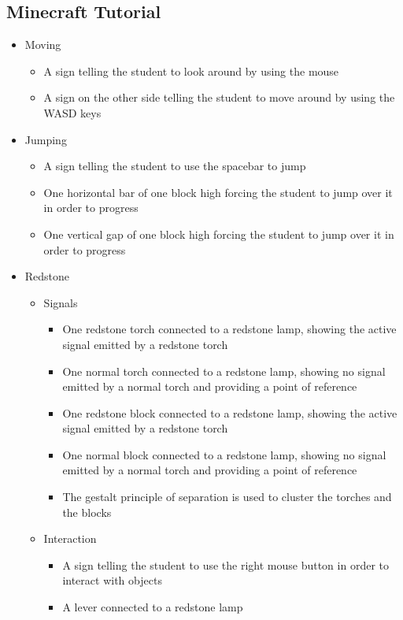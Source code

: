 \documentclass[11pt,twoside]{report} %
\begin{document}
\subsection{Minecraft Tutorial}

\begin{itemize}
	\item Moving
	\begin{itemize}
		\item A sign telling the student to look around by using the mouse
		\item A sign on the other side telling the student to move around by using the WASD keys
	\end{itemize}
	\item Jumping
	\begin{itemize}
		\item A sign telling the student to use the spacebar to jump
		\item One horizontal bar of one block high forcing the student to jump over it in order to progress
		\item One vertical gap of one block high forcing the student to jump over it in order to progress
	\end{itemize}
	\item Redstone
	\begin{itemize}
		\item Signals
		\begin{itemize}
			\item One redstone torch connected to a redstone lamp, showing the active signal emitted by a redstone torch
			\item One normal torch connected to a redstone lamp, showing no signal emitted by a normal torch and providing a point of reference
			\item One redstone block connected to a redstone lamp, showing the active signal emitted by a redstone torch
			\item One normal block connected to a redstone lamp, showing no signal emitted by a normal torch and providing a point of reference
			\item The gestalt principle of separation is used to cluster the torches and the blocks
		\end{itemize}
		\item Interaction
		\begin{itemize}
			\item A sign telling the student to use the right mouse button in order to interact with objects
			\item A lever connected to a redstone lamp

\end{itemize}
\end{itemize}
\end{itemize}
\end{document}

